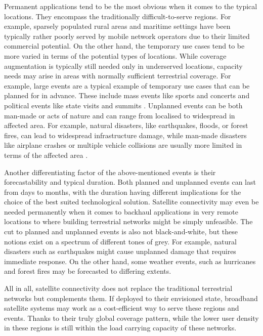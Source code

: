 \documentclass[english, 12pt, a4paper, elec, utf8, a-1b, online]{aaltothesis}
\begin{document}
Permanent applications tend to be the most obvious when it comes to the typical locations. They encompass the traditionally difficult-to-serve regions.
For example, sparsely populated rural areas and maritime settings have been typically rather poorly served by mobile network operators due to their limited commercial potential.
On the other hand, the temporary use cases tend to be more varied in terms of the potential types of locations. While coverage augmentation is typically still needed only in underserved locations, capacity needs may arise in areas with normally sufficient terrestrial coverage.
For example, large events are a typical example of temporary use cases that can be planned for in advance. These include mass events like sports and concerts and political events like state visits and summits \cite{erve2018trump, tcca2021airbus, airbus2023bahrain}.
Unplanned events can be both man-made or acts of nature and can range from localised to widespread in affected area. For example, natural disasters, like earthquakes, floods, or forest fires, can lead to widespread infrastructure damage, while man-made disasters like airplane crashes or multiple vehicle collisions are usually more limited in terms of the affected area \cite{firstnet2021wildfire, firstnet2021nashville}.

Another differentiating factor of the above-mentioned events is their forecastability and typical duration.
Both planned and unplanned events can last from days to months, with the duration having different implications for the choice of the best suited technological solution.
Satellite connectivity may even be needed permanently when it comes to backhaul applications in very remote locations to where building terrestrial networks might be simply unfeasible.
The cut to planned and unplanned events is also not black-and-white, but these notions exist on a spectrum of different tones of grey.
For example, natural disasters such as earthquakes might cause unplanned damage that requires immediate response.
On the other hand, some weather events, such as hurricanes and forest fires may be forecasted to differing extents.

All in all, satellite connectivity does not replace the traditional terrestrial networks but complements them. If deployed to their envisioned state, broadband satellite systems may work as a cost-efficient way to serve these regions and events. Thanks to their truly global coverage pattern, while the lower user density in these regions is still within the load carrying capacity of these networks.
\end{document}
